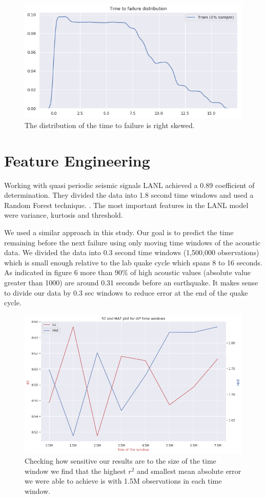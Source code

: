 \documentclass[]{llncs} %
\begin{document}
\begin{figure}
	\centering
	\includegraphics[width=.9\linewidth]{timeToFailureDistribution}
	\caption{The distribution of the time to failure is right skewed.}
	\label{fig:timeToFailureDistribution}
\end{figure}

\clearpage
\newpage
\section{Feature Engineering}
Working with quasi periodic seismic signals LANL achieved a 0.89 coefficient of determination. They divided the data into 1.8 second time windows and used a Random Forest technique. \cite{Bertrand}. The most important features in the LANL model were variance, kurtosis and threshold. \par
We used a similar approach in this study. Our goal is to predict the time remaining before the next failure using only moving time windows of the acoustic data. We divided the data into 0.3 second time windows (1,500,000 observations) which is small enough relative to the lab quake cycle which spans 8 to 16 seconds. As indicated in figure 6 more than 90\% of high acoustic values (absolute value greater than 1000) are around 0.31 seconds before an earthquake. It makes sense to divide our data by 0.3 sec windows to reduce error at the end of the quake cycle. 

\begin{figure}
	\centering
	\includegraphics[width=.9\linewidth]{rSquaredandMAE}
	\caption{Checking how sensitive our results are to the size of the time window we find that the highest $r^2$ and smallest mean absolute error we were able to achieve is with 1.5M observations in each time window.}
	\label{fig:rSquaredandMAE}
\end{figure}
\end{document}
